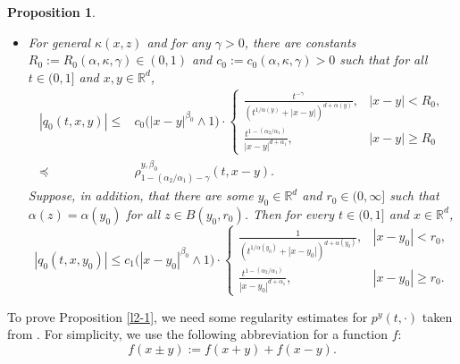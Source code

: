\documentclass[a4paper,11pt]{amsart}
\renewcommand{\le}{\leqslant}
\renewcommand{\ge}{\geqslant}
\newcommand{\R}{\mathds R}
\newcommand{\p}{\preceq}
\newcommand{\K}{\kappa}
\newcommand{\A}{\alpha}
\newcommand{\G}{\gamma}
\newtheorem{proposition}[theorem]{Proposition}
\theoremstyle{definition}
\begin{document}
\begin{proposition}
\begin{itemize}
\item[(2)]
For general $\K (x, z)$ and for any $\gamma>0$, there are constants
$R_0:=R_0(\A,\K, \G)\in(0,1)$ and $c_0:=c_0(\A,\K, \G)>0$ such
that for all $t\in(0,1]$ and $x,y\in \R^d$,
\begin{equation}\label{l2-1-1} \begin{split}
|q_0(t,x,y)|\le& c_0\big(|x-y|^{\beta_0}\wedge 1\big)\cdot
\begin{cases}
\frac{t^{-\gamma}}{(t^{{1/\A(y)}}+|x-y|)^{d+\A(y)}},& |x-y|< R_0,\\
\frac{t^{1-({\A_2}/{\A_1})}}{|x-y|^{d+\A_1}}, &|x-y|\ge R_0
\end{cases}\\
\p&\rho_{1-({\A_2}/{\A_1})-\gamma}^{y,\beta_0}(t,x-y).\end{split}
\end{equation}
Suppose, in addition, that there are some $y_0\in \R^d$ and $r_0\in(0,\infty]$ such that $\alpha(z)=\alpha(y_0)$ for all $z \in B(y_0,r_0)$. Then for every $t\in (0,1]$ and $x\in \R^d$,
\begin{equation}\label{l2-1-33}
|q_0(t,x,y_0)|\le c_1\big(|x-y_0|^{\beta_0}\wedge 1\big)\cdot
\begin{cases}
\frac{1}{(t^{{1/\A(y_0)}}+|x-y_0|)^{d+\A(y_0)}},& |x-y_0|< r_0,\\
\frac{t^{1-({\A_2}/{\A_1})}}{|x-y_0|^{d+\A_1}},&|x-y_0|\ge r_0.
\end{cases}
\end{equation}
\end{itemize}
\end{proposition}

\medskip

To prove Proposition \ref{l2-1}, we need some regularity estimates for $p^y(t,\cdot)$ taken from \cite{CZ}.
For simplicity, we use the following abbreviation for a function $f$:
$$
f(x\pm y):= f(x+y) + f(x-y).
$$
\end{document}
